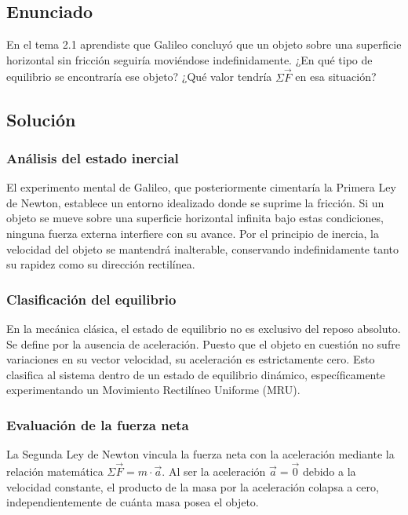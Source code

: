 \documentclass[12pt, a4paper]{article}
\begin{document}
\newpage

\subsection*{Enunciado}
En el tema 2.1 aprendiste que Galileo concluyó que un objeto sobre una superficie horizontal sin fricción seguiría moviéndose indefinidamente. ¿En qué tipo de equilibrio se encontraría ese objeto? ¿Qué valor tendría $\Sigma\vec{F}$ en esa situación?

\subsection*{Solución}

\subsubsection*{Análisis del estado inercial}
El experimento mental de Galileo, que posteriormente cimentaría la Primera Ley de Newton, establece un entorno idealizado donde se suprime la fricción. Si un objeto se mueve sobre una superficie horizontal infinita bajo estas condiciones, ninguna fuerza externa interfiere con su avance. Por el principio de inercia, la velocidad del objeto se mantendrá inalterable, conservando indefinidamente tanto su rapidez como su dirección rectilínea.

\subsubsection*{Clasificación del equilibrio}
En la mecánica clásica, el estado de equilibrio no es exclusivo del reposo absoluto. Se define por la ausencia de aceleración. Puesto que el objeto en cuestión no sufre variaciones en su vector velocidad, su aceleración es estrictamente cero. Esto clasifica al sistema dentro de un estado de equilibrio dinámico, específicamente experimentando un Movimiento Rectilíneo Uniforme (MRU).

\subsubsection*{Evaluación de la fuerza neta}
La Segunda Ley de Newton vincula la fuerza neta con la aceleración mediante la relación matemática $\Sigma\vec{F} = m \cdot \vec{a}$. Al ser la aceleración $\vec{a} = \vec{0}$ debido a la velocidad constante, el producto de la masa por la aceleración colapsa a cero, independientemente de cuánta masa posea el objeto.
\end{document}
